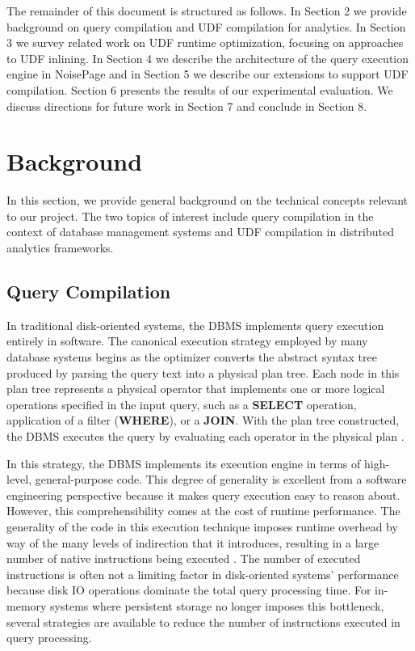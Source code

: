 \documentclass{vldb}
\newcommand{\dbCode}[1]{{\sffamily\small \textbf{#1}}\xspace}
\begin{document}
The remainder of this document is structured as follows. In Section 2 we provide background on query compilation and UDF compilation for analytics. In Section 3 we survey related work on UDF runtime optimization, focusing on approaches to UDF inlining. In Section 4 we describe the architecture of the query execution engine in NoisePage and in Section 5 we describe our extensions to support UDF compilation. Section 6 presents the results of our experimental evaluation. We discuss directions for future work in Section 7 and conclude in Section 8.


\section{Background}

In this section, we provide general background on the technical concepts relevant to our project. The two topics of interest include query compilation in the context of database management systems and UDF compilation in distributed analytics frameworks.

\subsection{Query Compilation}

In traditional disk-oriented systems, the DBMS implements query execution entirely in software. The canonical execution strategy employed by many database systems begins as the optimizer converts the abstract syntax tree produced by parsing the query text into a physical plan tree. Each node in this plan tree represents a physical operator that implements one or more logical operations specified in the input query, such as a \dbCode{SELECT} operation, application of a filter (\dbCode{WHERE}), or a \dbCode{JOIN}. With the plan tree constructed, the DBMS executes the query by evaluating each operator in the physical plan \cite{graefe93, graefe94, dbconcepts}. 

In this strategy, the DBMS implements its execution engine in terms of high-level, general-purpose code. This degree of generality is excellent from a software engineering perspective because it makes query execution easy to reason about. However, this comprehensibility comes at the cost of runtime performance. The generality of the code in this execution technique imposes runtime overhead by way of the many levels of indirection that it introduces, resulting in a large number of native instructions being executed \cite{freedman14}. The number of executed instructions is often not a limiting factor in disk-oriented systems' performance because disk IO operations dominate the total query processing time. For in-memory systems where persistent storage no longer imposes this bottleneck, several strategies are available to reduce the number of instructions executed in query processing.
\end{document}
